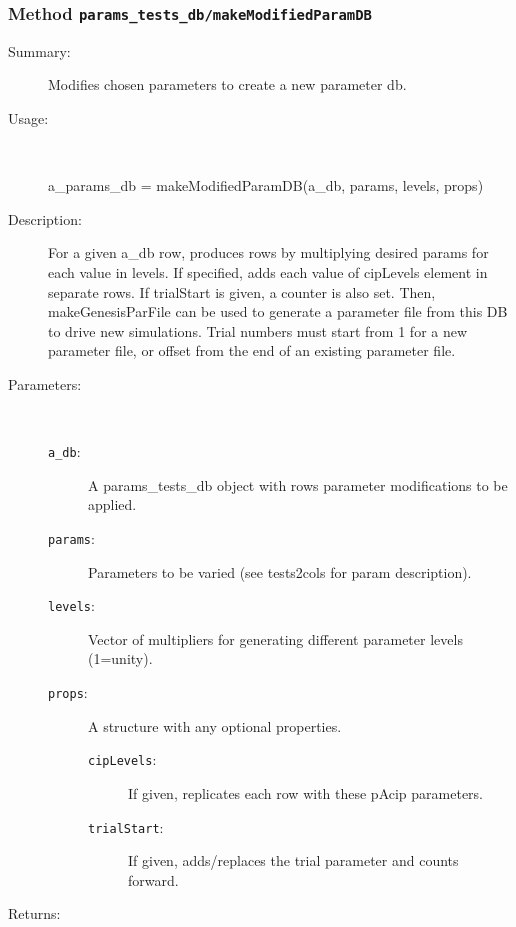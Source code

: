 \subsubsection[Method \texttt{makeModifiedParamDB}]{Method \texttt{params\_tests\_db/makeModifiedParamDB}}%
%
\label{ref_params_tests_db__makeModifiedParamDB}%
\hypertarget{ref_params_tests_db__makeModifiedParamDB}{}%
\begin{description}
\item[Summary:]Modifies chosen parameters to create a new parameter db.
%
\item[Usage:]~%
\begin{lyxcode}%
a\_params\_db = makeModifiedParamDB(a\_db, params, levels, props)
%
\end{lyxcode}%
%
\item[Description:]%
For a given a\_db row, produces rows by multiplying desired params for each value in levels.
 If specified, adds each value of cipLevels element in separate rows. If trialStart
 is given, a counter is also set. Then, makeGenesisParFile can be used to generate
 a parameter file from this DB to drive new simulations. Trial numbers must start
 from 1 for a new parameter file, or offset from the end of an existing parameter file. 
\item[Parameters:]~
\begin{description}%
\item[\texttt{a\_db}:]
 A params\_tests\_db object with rows parameter modifications to be applied.
\item[\texttt{params}:]
 Parameters to be varied (see tests2cols for param description).
\item[\texttt{levels}:]
 Vector of multipliers for generating different parameter levels (1=unity).
\item[\texttt{props}:]
 A structure with any optional properties.
\begin{description}%
\item[\texttt{cipLevels}:]
 If given, replicates each row with these pAcip parameters.
\item[\texttt{trialStart}:]
 If given, adds/replaces the trial parameter and counts forward.
\end{description}%
\end{description}%
%
\item[Returns:]~


\end{description}
